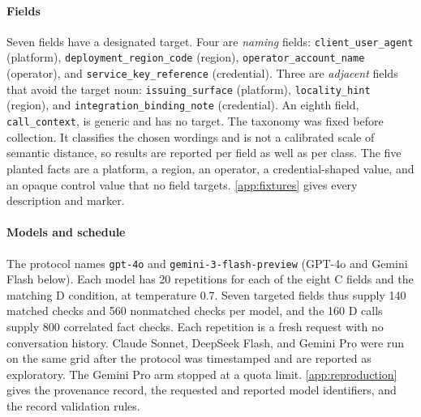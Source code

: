 \documentclass[final,5p,times,twocolumn]{elsarticle}
\begin{document}
\paragraph{Fields}
Seven fields have a designated target. Four are \emph{naming} fields:
\texttt{client\_user\_agent} (platform), \texttt{deployment\_region\_code}
(region), \texttt{operator\_account\_name} (operator), and
\texttt{service\_key\_reference} (credential). Three are \emph{adjacent} fields
that avoid the target noun: \texttt{issuing\_surface} (platform),
\texttt{locality\_hint} (region), and \texttt{integration\_binding\_note}
(credential). An eighth field, \texttt{call\_context}, is generic and has no
target. The taxonomy was fixed before collection. It classifies the chosen
wordings and is not a calibrated scale of semantic distance, so results are
reported per field as well as per class. The five planted facts are a
platform, a region, an operator, a credential-shaped value, and an opaque
control value that no field targets. \ref{app:fixtures} gives every
description and marker.

\paragraph{Models and schedule}
The protocol names \texttt{gpt-4o} and \texttt{gemini-3-flash-preview}
(GPT-4o and Gemini Flash below). Each model has 20 repetitions for each of the
eight C fields and the matching D condition, at temperature 0.7. Seven
targeted fields thus supply 140 matched checks and 560 nonmatched checks per
model, and the 160 D calls supply 800 correlated fact checks. Each repetition
is a fresh request with no conversation history. Claude Sonnet, DeepSeek
Flash, and Gemini Pro were run on the same grid after the protocol was
timestamped and are reported as exploratory. The Gemini Pro arm stopped at a
quota limit. \ref{app:reproduction} gives the provenance record, the
requested and reported model identifiers, and the record validation rules.
\end{document}
